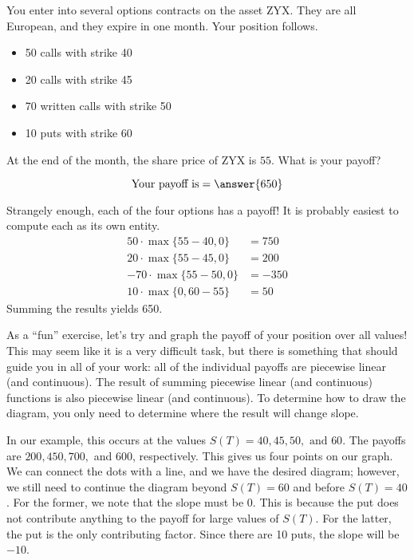 \documentclass{ximera}
\begin{document}
\begin{question}
You enter into several options contracts on the asset ZYX. They are all European, and they expire in one month. Your position follows.
	\begin{itemize}
	\item 50 calls with strike 40\\
	\item 20 calls with strike 45\\
	\item 70 written calls with strike 50\\
	\item 10 puts with strike 60
	\end{itemize}
At the end of the month, the share price of ZYX is $55$. What is your payoff?
	\begin{prompt}
		\begin{equation*}
		\text{Your payoff is}=\answer{650}
		\end{equation*}
	\end{prompt}
\end{question}

\begin{solution}
Strangely enough, each of the four options has a payoff! It is probably easiest to compute each as its own entity.
	\begin{align*}
	50\cdot\max\{55-40,0\}&=750\\
	20\cdot\max\{55-45,0\}&=200\\
	-70\cdot\max\{55-50,0\}&=-350\\
	10\cdot\max\{0, 60-55\}&=50
	\end{align*}
Summing the results yields 650. 
\end{solution}

As a ``fun'' exercise, let's try and graph the payoff of your position over all values! This may seem like it is a very difficult task, but there is something that should guide you in all of your work: all of the individual payoffs are piecewise linear (and continuous). The result of summing piecewise linear (and continuous) functions is also piecewise linear (and continuous). To determine how to draw the diagram, you only need to determine where the result will change slope.

 In our example, this occurs at the values $S(T)=40, 45, 50, \text{ and }60$. The payoffs are $200, 450, 700,$ and $600$, respectively. This gives us four points on our graph. We can connect the dots with a line, and we have the desired diagram; however, we still need to continue the diagram beyond $S(T)=60$ and before $S(T)=40$. For the former, we note that the slope must be 0. This is because the put does not contribute anything to the payoff for large values of $S(T)$. For the latter, the put is the only contributing factor. Since there are 10 puts, the slope will be $-10$. 
\end{document}
